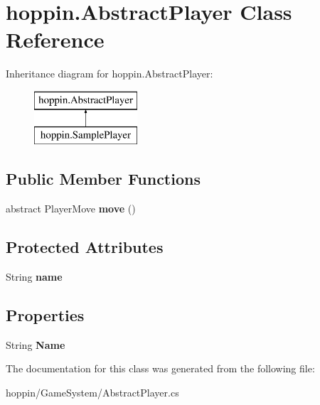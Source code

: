 \hypertarget{classhoppin_1_1_abstract_player}{}\section{hoppin.\+Abstract\+Player Class Reference}
\label{classhoppin_1_1_abstract_player}
Inheritance diagram for hoppin.\+Abstract\+Player\+:\begin{figure}[H]
\begin{center}
\leavevmode
\includegraphics[height=2.000000cm]{classhoppin_1_1_abstract_player}
\end{center}
\end{figure}
\subsection*{Public Member Functions}
\begin{DoxyCompactItemize}
\item 
abstract Player\+Move {\bfseries move} ()\hypertarget{classhoppin_1_1_abstract_player_a0f8f66f25014638ed78e82b294b4b306}{}\label{classhoppin_1_1_abstract_player_a0f8f66f25014638ed78e82b294b4b306}

\end{DoxyCompactItemize}
\subsection*{Protected Attributes}
\begin{DoxyCompactItemize}
\item 
String {\bfseries name}\hypertarget{classhoppin_1_1_abstract_player_a8fee3a10d3d1330318327b382cbedee7}{}\label{classhoppin_1_1_abstract_player_a8fee3a10d3d1330318327b382cbedee7}

\end{DoxyCompactItemize}
\subsection*{Properties}
\begin{DoxyCompactItemize}
\item 
String {\bfseries Name}\hypertarget{classhoppin_1_1_abstract_player_ae752b9683f48405b7cbc5fa470968dd1}{}\label{classhoppin_1_1_abstract_player_ae752b9683f48405b7cbc5fa470968dd1}

\end{DoxyCompactItemize}


The documentation for this class was generated from the following file\+:\begin{DoxyCompactItemize}
\item 
hoppin/\+Game\+System/Abstract\+Player.\+cs\end{DoxyCompactItemize}
